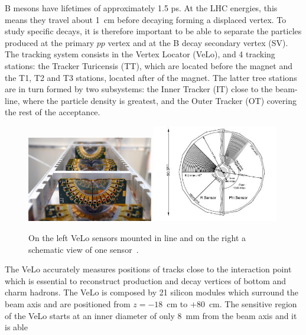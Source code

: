 B mesons have lifetimes of approximately 1.5 ps. At the LHC energies, this means they travel about
1~cm before decaying forming a displaced vertex. To study specific decays, it is therefore important
to be able to separate the particles produced at the primary $pp$ vertex and at the B decay secondary vertex (SV).
The tracking system consists in the Vertex Locator (VeLo), and 4 tracking stations:
the Tracker Turicensis (TT), which are located before the magnet and the T1, T2 and T3 stations,
located after of the magnet. The latter tree stations are in turn formed by two subsystems:
the Inner Tracker (IT) close to the beam-line, where the particle density is greatest, and
the Outer Tracker (OT) covering the rest of the acceptance.
%
\begin{center}
\begin{figure}[h!]
\centering 
\includegraphics[width=0.49\textwidth]{Detector/figs/detector/VELO.png}
\includegraphics[width=0.49\textwidth]{Detector/figs/detector/VELO_scheme.png}
\caption{On the left VeLo sensors mounted in line and on the right a schematic view of one sensor~\cite{Alves:2008zz}.}
\label{VeLo}
\end{figure}
\end{center}
%
The VeLo accurately measures positions of tracks close to the interaction point which is essential to reconstruct
 production and decay vertices of bottom and charm hadrons. The VeLo is composed by 21
silicon modules which surround the beam axis and are positioned from $z = -18$~cm to $+80$~cm.
The sensitive region of the VeLo starts at an inner diameter of only 8~mm from the beam axis and it is able
